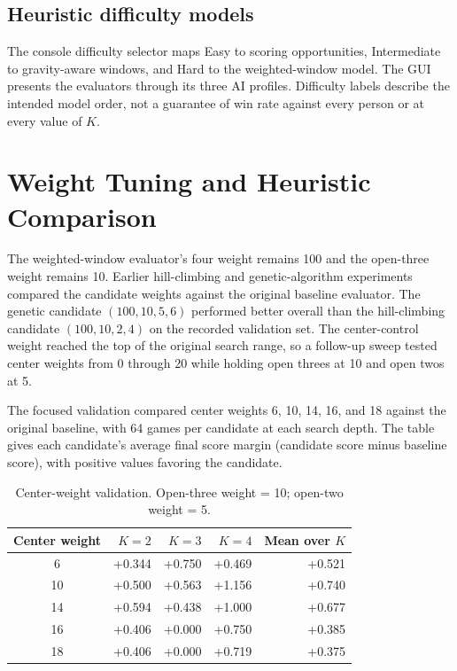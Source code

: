 \documentclass[11pt,a4paper]{article}
\begin{document}
\subsection{Heuristic difficulty models}
The console difficulty selector maps Easy to scoring opportunities,
Intermediate to gravity-aware windows, and Hard to the weighted-window model.
The GUI presents the evaluators through its three AI profiles. Difficulty
labels describe the intended model order, not a guarantee of win rate against
every person or at every value of $K$.

\section{Weight Tuning and Heuristic Comparison}

The weighted-window evaluator's four weight remains 100 and the open-three
weight remains 10. Earlier hill-climbing and genetic-algorithm experiments
compared the candidate weights against the original baseline evaluator.
The genetic candidate $(100,10,5,6)$ performed better overall than the
hill-climbing candidate $(100,10,2,4)$ on the recorded validation set. The
center-control weight reached the top of the original search range, so a
follow-up sweep tested center weights from 0 through 20 while holding open
threes at 10 and open twos at 5.

The focused validation compared center weights 6, 10, 14, 16, and 18 against
the original baseline, with 64 games per candidate at each search depth. The
table gives each candidate's average final score margin (candidate score
minus baseline score), with positive values favoring the candidate.

\begin{table}[ht]
\centering
\caption{Center-weight validation. Open-three weight = 10; open-two weight = 5.}
\begin{tabular}{crrrr}
\toprule
Center weight & $K=2$ & $K=3$ & $K=4$ & Mean over $K$\\
\midrule
6  & +0.344 & +0.750 & +0.469 & +0.521\\
10 & +0.500 & +0.563 & +1.156 & +0.740\\
14 & +0.594 & +0.438 & +1.000 & +0.677\\
16 & +0.406 & +0.000 & +0.750 & +0.385\\
18 & +0.406 & +0.000 & +0.719 & +0.375\\
\bottomrule
\end{tabular}
\end{table}
\end{document}
